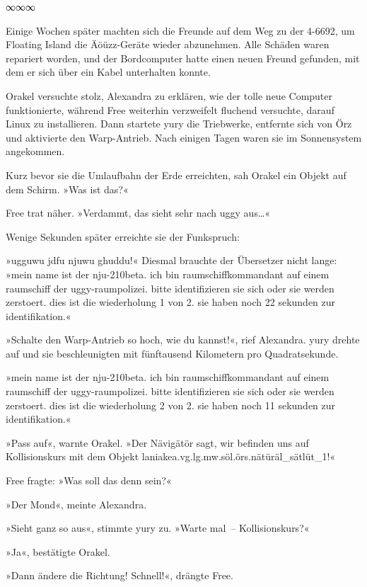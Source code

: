 \begin{center}
    ∞∞∞
\end{center}

Einige Wochen später machten sich die Freunde auf dem Weg zu der 4-6692, um Floating Island die Äöüzz-Geräte wieder abzunehmen. Alle Schäden waren repariert worden, und der Bordcomputer hatte einen neuen Freund gefunden, mit dem er sich über ein Kabel unterhalten konnte.

Orakel versuchte stolz, Alexandra zu erklären, wie der tolle neue Computer funktionierte, während Free weiterhin verzweifelt fluchend versuchte, darauf Linux zu installieren. Dann startete yury die Triebwerke, entfernte sich von Örz und aktivierte den Warp-Antrieb. Nach einigen Tagen waren sie im Sonnensystem angekommen.

Kurz bevor sie die Umlaufbahn der Erde erreichten, sah Orakel ein Objekt auf dem Schirm. »Was ist das?«

Free trat näher. »Verdammt, das sieht sehr nach uggy aus…«

Wenige Sekunden später erreichte sie der Funkspruch:

»ugguwu jdfu njuwu ghuddu!« Diesmal brauchte der Übersetzer nicht lange: »mein name ist der nju-210beta. ich bin raumschiffkommandant auf einem raumschiff der uggy-raumpolizei. bitte identifizieren sie sich oder sie werden zerstoert. dies ist die wiederholung 1 von 2. sie haben noch 22 sekunden zur identifikation.«

»Schalte den Warp-Antrieb so hoch, wie du kannst!«, rief Alexandra. yury drehte auf und sie beschleunigten mit fünftausend Kilometern pro Quadratsekunde.

»mein name ist der nju-210beta. ich bin raumschiffkommandant auf einem raumschiff der uggy-raumpolizei. bitte identifizieren sie sich oder sie werden zerstoert. dies ist die wiederholung 2 von 2. sie haben noch 11 sekunden zur identifikation.«

»Pass auf«, warnte Orakel. »Der Nävigätör sagt, wir befinden uns auf Kollisionskurs mit dem Objekt laniakea.vg.lg.mw.söl.örs.nätüräl\_sätlüt\_1!«

Free fragte: »Was soll das denn sein?«

»Der Mond«, meinte Alexandra.

»Sieht ganz so aus«, stimmte yury zu. »Warte mal~– Kollisionskurs?«

»Ja«, bestätigte Orakel.

»Dann ändere die Richtung! Schnell!«, drängte Free.

